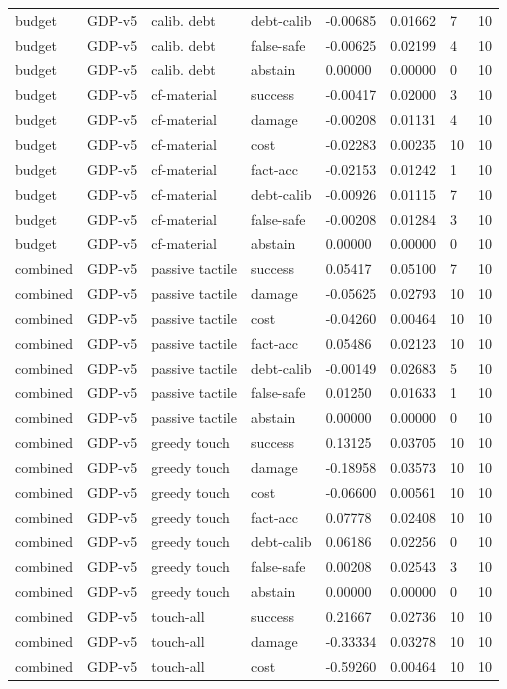 \documentclass{article}
\begin{document}
\begin{center}
\begin{longtable}{llllllll}
budget & GDP-v5 & calib. debt & debt-calib & -0.00685 & 0.01662 & 7 & 10 \\
budget & GDP-v5 & calib. debt & false-safe & -0.00625 & 0.02199 & 4 & 10 \\
budget & GDP-v5 & calib. debt & abstain & 0.00000 & 0.00000 & 0 & 10 \\
budget & GDP-v5 & cf-material & success & -0.00417 & 0.02000 & 3 & 10 \\
budget & GDP-v5 & cf-material & damage & -0.00208 & 0.01131 & 4 & 10 \\
budget & GDP-v5 & cf-material & cost & -0.02283 & 0.00235 & 10 & 10 \\
budget & GDP-v5 & cf-material & fact-acc & -0.02153 & 0.01242 & 1 & 10 \\
budget & GDP-v5 & cf-material & debt-calib & -0.00926 & 0.01115 & 7 & 10 \\
budget & GDP-v5 & cf-material & false-safe & -0.00208 & 0.01284 & 3 & 10 \\
budget & GDP-v5 & cf-material & abstain & 0.00000 & 0.00000 & 0 & 10 \\
combined & GDP-v5 & passive tactile & success & 0.05417 & 0.05100 & 7 & 10 \\
combined & GDP-v5 & passive tactile & damage & -0.05625 & 0.02793 & 10 & 10 \\
combined & GDP-v5 & passive tactile & cost & -0.04260 & 0.00464 & 10 & 10 \\
combined & GDP-v5 & passive tactile & fact-acc & 0.05486 & 0.02123 & 10 & 10 \\
combined & GDP-v5 & passive tactile & debt-calib & -0.00149 & 0.02683 & 5 & 10 \\
combined & GDP-v5 & passive tactile & false-safe & 0.01250 & 0.01633 & 1 & 10 \\
combined & GDP-v5 & passive tactile & abstain & 0.00000 & 0.00000 & 0 & 10 \\
combined & GDP-v5 & greedy touch & success & 0.13125 & 0.03705 & 10 & 10 \\
combined & GDP-v5 & greedy touch & damage & -0.18958 & 0.03573 & 10 & 10 \\
combined & GDP-v5 & greedy touch & cost & -0.06600 & 0.00561 & 10 & 10 \\
combined & GDP-v5 & greedy touch & fact-acc & 0.07778 & 0.02408 & 10 & 10 \\
combined & GDP-v5 & greedy touch & debt-calib & 0.06186 & 0.02256 & 0 & 10 \\
combined & GDP-v5 & greedy touch & false-safe & 0.00208 & 0.02543 & 3 & 10 \\
combined & GDP-v5 & greedy touch & abstain & 0.00000 & 0.00000 & 0 & 10 \\
combined & GDP-v5 & touch-all & success & 0.21667 & 0.02736 & 10 & 10 \\
combined & GDP-v5 & touch-all & damage & -0.33334 & 0.03278 & 10 & 10 \\
combined & GDP-v5 & touch-all & cost & -0.59260 & 0.00464 & 10 & 10 \\
\bottomrule
\end{longtable}
\renewcommand{\arraystretch}{1.0}
\end{center}
\end{document}
